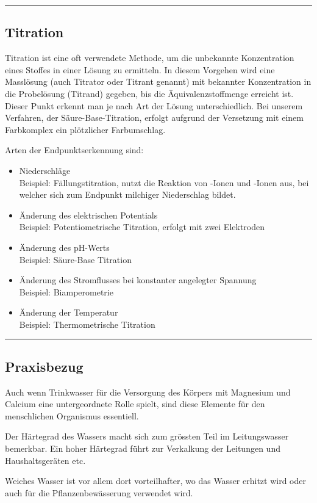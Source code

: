 \begin{addmargin}[3cm]{0cm}
\begin{table}[H]
	\end{table}
\end{addmargin}


\rule{\linewidth}{0.5mm}
\subsection{Titration}
\begin{addmargin}[3cm]{0cm}
	Titration ist eine oft verwendete Methode, um die unbekannte Konzentration eines Stoffes in einer Lösung zu ermitteln. In diesem Vorgehen wird eine Masslösung (auch Titrator oder Titrant genannt) mit bekannter Konzentration in die Probelösung (Titrand) gegeben, bis die Äquivalenzstoffmenge erreicht ist. Dieser Punkt erkennt man je nach Art der Lösung unterschiedlich. Bei unserem Verfahren, der Säure-Base-Titration, erfolgt aufgrund der Versetzung mit einem Farbkomplex ein plötzlicher Farbumschlag.
	
	Arten der Endpunktserkennung sind:
	\begin{itemize}
		\item Niederschläge \\ Beispiel: Fällungstitration, nutzt die Reaktion von -Ionen und -Ionen aus, bei welcher sich zum Endpunkt milchiger Niederschlag bildet.
		
		\item Änderung des elektrischen Potentials \\ Beispiel: Potentiometrische Titration, erfolgt mit zwei Elektroden
		
		\item Änderung des pH-Werts \\ Beispiel: Säure-Base Titration
		
		\item Änderung des Stromflusses bei konstanter angelegter Spannung \\ Beispiel: Biamperometrie
		
		\item Änderung der Temperatur \\ Beispiel: Thermometrische Titration
	\end{itemize}
\end{addmargin}
 
 
\rule{\linewidth}{0.5mm}
\subsection{Praxisbezug}
\begin{addmargin}[3cm]{0cm}
	Auch wenn Trinkwasser für die Versorgung des Körpers mit Magnesium und Calcium eine untergeordnete Rolle spielt, sind diese Elemente für den menschlichen Organismus essentiell.
	
	Der Härtegrad des Wassers macht sich zum grössten Teil im Leitungswasser bemerkbar. Ein hoher Härtegrad führt zur Verkalkung der Leitungen und Haushaltsgeräten etc.
	
	Weiches Wasser ist vor allem dort vorteilhafter, wo das Wasser erhitzt wird oder auch für die Pflanzenbewässerung verwendet wird. 
\end{addmargin}